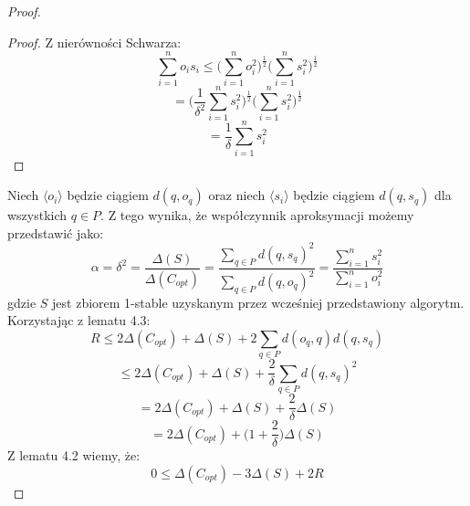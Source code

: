 \begin{proof}
\begin{lemma}{\cite{Arya2004LocalSH}}
    \end{lemma}
    \begin{proof}
        Z nierówności Schwarza:
        \begin{equation}
            \sum_{i=1}^{n} o_{i} s_{i} \leq \Big( \sum_{i=1}^{n} o_{i}^{2} \Big)^{\frac{1}{2}} \Big( \sum_{i=1}^{n} s_{i}^{2} \Big)^{\frac{1}{2}}
        \end{equation}
        \begin{equation}
            = \Big( \frac{1}{\delta^{2}}\sum_{i=1}^{n} s_{i}^{2} \Big)^{\frac{1}{2}} \Big( \sum_{i=1}^{n} s_{i}^{2} \Big)^{\frac{1}{2}}
        \end{equation}
        \begin{equation}
            = \frac{1}{\delta} \sum_{i=1}^{n} s_{i}^{2}
        \end{equation}
    \end{proof}
    Niech $\langle o_{i} \rangle$ będzie ciągiem $d(q, o_{q})$ oraz niech $\langle s_{i} \rangle$ będzie ciągiem $d(q,s_{q})$ dla wszystkich $q \in P$.
    Z tego wynika, że współczynnik aproksymacji możemy przedstawić jako:
    \begin{equation}
        \alpha = \delta^{2} = \frac{\Delta(S)}{\Delta(C_{opt})} = \frac{\sum_{q \in P} d(q,s_{q})^{2}}{\sum_{q \in P} d(q,o_{q})^{2}} =\frac{\sum_{i=1}^{n} s_{i}^{2}}{\sum_{i=1}^{n} o_{i}^{2}}
    \end{equation}
    gdzie $S$ jest zbiorem 1-stable uzyskanym przez wcześniej przedstawiony algorytm.
    Korzystając z lematu 4.3:
    \begin{equation}
        R \leq 2\Delta(C_{opt}) + \Delta(S) + 2\sum_{q \in P} d(o_{q}, q)d(q, s_{q}) 
    \end{equation}
    \begin{equation}
        \leq 2\Delta(C_{opt}) + \Delta(S) + \frac{2}{\delta}\sum_{q \in P} d(q, s_{q})^{2} 
    \end{equation}
    \begin{equation}
        = 2\Delta(C_{opt}) + \Delta(S) + \frac{2}{\delta}\Delta(S)
    \end{equation}
    \begin{equation}
        = 2\Delta(C_{opt}) + \Big(1 + \frac{2}{\delta} \Big)\Delta(S)
    \end{equation}
    Z lematu 4.2 wiemy, że:
    \begin{equation}
        0 \leq \Delta(C_{opt}) - 3\Delta(S) + 2R
    \end{equation}
    \begin{equation}

\end{equation}
\end{proof}
